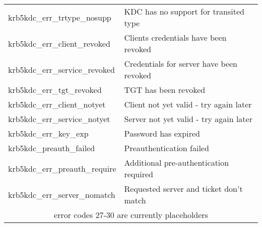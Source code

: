 \begin{small}
\begin{tabular}{ll}
{\sc krb5kdc_err_trtype_nosupp }& KDC has no support for transited type \\
{\sc krb5kdc_err_client_revoked }& Clients credentials have been revoked \\
{\sc krb5kdc_err_service_revoked }& Credentials for server have been revoked \\
{\sc krb5kdc_err_tgt_revoked }& TGT has been revoked \\
{\sc krb5kdc_err_client_notyet }& Client not yet valid - try again later \\
{\sc krb5kdc_err_service_notyet }& Server not yet valid - try again later \\
{\sc krb5kdc_err_key_exp }&  	 Password has expired \\
{\sc krb5kdc_preauth_failed }&  	 Preauthentication failed \\
{\sc krb5kdc_err_preauth_require }&	Additional pre-authentication required \\
{\sc krb5kdc_err_server_nomatch }&	Requested server and ticket don't match \\
\multicolumn{2}{c}{error codes 27-30 are currently placeholders}\\

\end{tabular}


\end{small}
